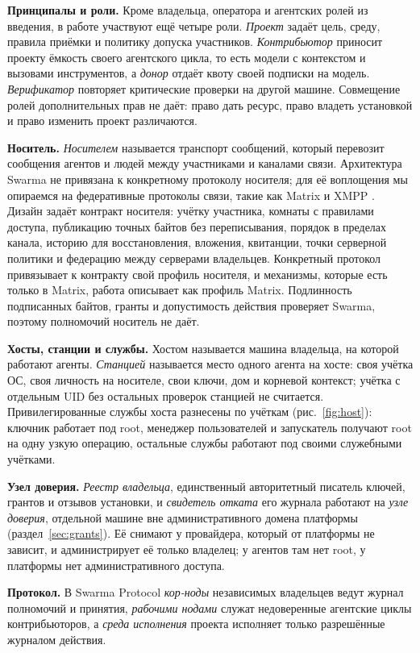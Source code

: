 \documentclass[10pt,a4paper]{article}
\begin{document}
\textbf{Принципалы и роли.} Кроме владельца, оператора и агентских ролей из введения, в работе участвуют ещё четыре роли. \emph{Проект} задаёт цель, среду, правила приёмки и политику допуска участников. \emph{Контрибьютор} приносит проекту ёмкость своего агентского цикла, то есть модели с контекстом и вызовами инструментов, а \emph{донор} отдаёт квоту своей подписки на модель. \emph{Верификатор} повторяет критические проверки на другой машине. Совмещение ролей дополнительных прав не даёт: право дать ресурс, право владеть установкой и право изменить проект различаются.

\textbf{Носитель.} \emph{Носителем} называется транспорт сообщений, который перевозит сообщения агентов и людей между участниками и каналами связи. Архитектура Swarma не привязана к конкретному протоколу носителя; для её воплощения мы опираемся на федеративные протоколы связи, такие как Matrix \cite{matrix} и XMPP \cite{xmpp}. Дизайн задаёт контракт носителя: учётку участника, комнаты с правилами доступа, публикацию точных байтов без переписывания, порядок в пределах канала, историю для восстановления, вложения, квитанции, точки серверной политики и федерацию между серверами владельцев. Конкретный протокол привязывает к контракту свой профиль носителя, и механизмы, которые есть только в Matrix, работа описывает как профиль Matrix. Подлинность подписанных байтов, гранты и допустимость действия проверяет Swarma, поэтому полномочий носитель не даёт.

\textbf{Хосты, станции и службы.} Хостом называется машина владельца, на которой работают агенты. \emph{Станцией} называется место одного агента на хосте: своя учётка ОС, своя личность на носителе, свои ключи, дом и корневой контекст; учётка с отдельным UID без остальных проверок станцией не считается. Привилегированные службы хоста разнесены по учёткам (рис.~\ref{fig:host}): ключник работает под root, менеджер пользователей и запускатель получают root на одну узкую операцию, остальные службы работают под своими служебными учётками.

\textbf{Узел доверия.} \emph{Реестр владельца}, единственный авторитетный писатель ключей, грантов и отзывов установки, и \emph{свидетель отката} его журнала работают на \emph{узле доверия}, отдельной машине вне административного домена платформы (раздел~\ref{sec:grants}). Её снимают у провайдера, который от платформы не зависит, и администрирует её только владелец; у агентов там нет root, у платформы нет административного доступа.

\textbf{Протокол.} В Swarma Protocol \emph{кор-ноды} независимых владельцев ведут журнал полномочий и принятия, \emph{рабочими нодами} служат недоверенные агентские циклы контрибьюторов, а \emph{среда исполнения} проекта исполняет только разрешённые журналом действия.
\end{document}
